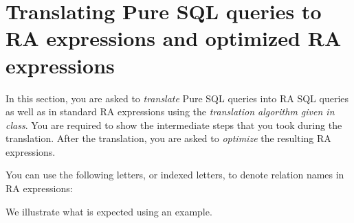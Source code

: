 \documentclass[11pt]{article}
\begin{document}
\section{Translating Pure SQL queries to RA expressions and optimized RA expressions}

In this section, you are asked to \emph{translate} Pure SQL queries into RA SQL queries as well as in standard RA expressions using the \emph{translation
algorithm given in class}.    You are required to show the intermediate steps that you took during the
translation.   After the translation, you are asked to \emph{optimize} the resulting RA expressions.

You can use the following letters, or indexed letters, to denote relation names in RA expressions:

\begin{center}
\end{center}

We illustrate what is expected using an example.
\end{document}
